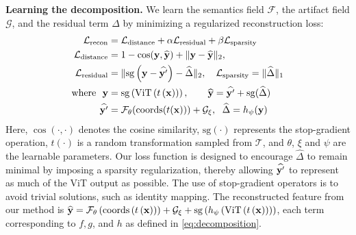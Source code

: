 \documentclass[runningheads]{llncs}
\renewcommand{\paragraph}[1]{\vspace{1.25mm}\noindent\textbf{#1}}
\begin{document}
\paragraph{Learning the decomposition.} We learn the semantics field $\mathcal{F}$, the artifact field $\mathcal{G}$, and the residual term $\Delta$ by minimizing a regularized reconstruction loss:
\begin{align}
    \mathcal{L}_\text{recon}      & = \mathcal{L}_{\text{distance}} + \alpha \mathcal{L}_{\text{residual}} + \beta  \mathcal{L}_{\text{sparsity}} \label{eq:recon}                             \\
    \mathcal{L}_{\text{distance}} & = 1 - \cos(\vb{y}, \widehat{\vb{y}}) + \| \vb{y} - \widehat{\vb{y}} \|_2,                                                                                  \\
    \mathcal{L}_\text{residual}   & = \|\mathrm{sg}\left(\vb{y} - \widehat{\vb{y}'}\right) - \widehat{\Delta}\|_2, \hspace{1em} \mathcal{L}_{\text{sparsity}} = \|\widehat{\Delta}\|_1         \\
    \text{where}~~\vb{y}          & = \mathrm{sg}\left(\mathrm{ViT}\left(t\left(\vb{x}\right)\right)\right), \hspace{2em} \widehat{\vb{y}} = \widehat{\vb{y}'} + \mathrm{sg}(\widehat{\Delta}) \\
    \widehat{\vb{y}'}             & = \mathcal{F}_{\theta}(\mathrm{coords}(t(\vb{x}))) + \mathcal{G}_{\xi}, \hspace{0.6em} \widehat{\Delta} = h_{\psi}(\vb{y})
\end{align}
Here, $\cos(\cdot, \cdot)$ denotes the cosine similarity, $\mathrm{sg}(\cdot)$ represents the stop-gradient operation, $t(\cdot)$ is a random transformation sampled from $\mathcal{T}$, and $\theta$, $\xi$ and $\psi$ are the learnable parameters. Our loss function is designed to encourage $\widehat{\Delta}$ to remain minimal by imposing a sparsity regularization, thereby allowing $\widehat{\vb{y}'}$ to represent as much of the ViT output as possible. The use of stop-gradient operators is to avoid trivial solutions, such as identity mapping. The reconstructed feature from our method is $\widehat{\vb{y}} = \mathcal{F}_{\theta}\left(\mathrm{coords}\left(t\left(\vb{x}\right)\right)\right) + \mathcal{G}_{\xi} + \mathrm{sg}\left(h_{\psi}\left(\mathrm{ViT}\left(t\left(\vb{x}\right)\right)\right)\right)$, each term corresponding to $f, g$, and $h$ as defined in \cref{eq:decomposition}.
\end{document}
